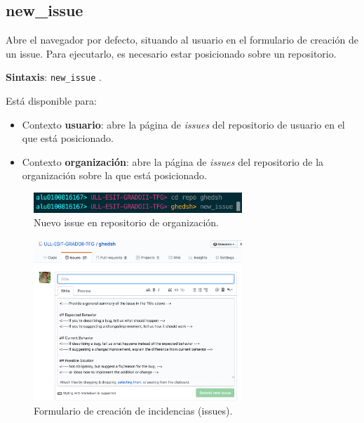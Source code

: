 \subsection{new\_issue}
\label{3.3.10}

Abre el navegador por defecto, situando al usuario en el formulario de creación de un issue. Para ejecutarlo, es necesario estar posicionado sobre un repositorio.

\textbf{Sintaxis}: \verb|new_issue| .

Está disponible para:
\begin{itemize}
	\item Contexto \textbf{usuario}: abre la página de {\it issues} del repositorio de usuario en el que está posicionado.
	\item Contexto \textbf{organización}: abre la página de {\it issues} del repositorio de la organización sobre la que está posicionado.
\end{itemize}
\begin{figure}[H]
	\begin{center}
	\includegraphics[width=0.7\textwidth]{images/new-issue.png}
	\caption{Nuevo issue en repositorio de organización.}
	\label{fig:new-issue}
	\end{center}
\end{figure}

\begin{figure}[H]
	\begin{center}
	\includegraphics[width=0.7\textwidth]{images/issue-form.png}
	\caption{Formulario de creación de incidencias (issues).}
	\label{fig:new-issue}
	\end{center}
\end{figure}

